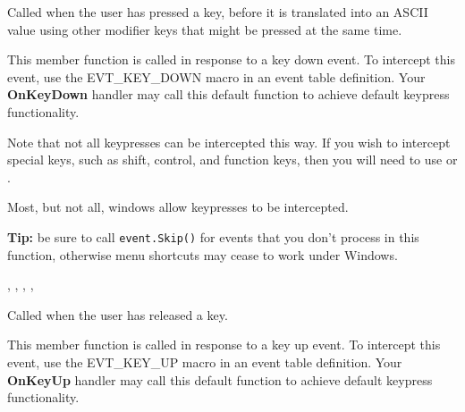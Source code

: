 
Called when the user has pressed a key, before it is translated into an ASCII value using other
modifier keys that might be pressed at the same time.




This member function is called in response to a key down event. To intercept this event,
use the EVT\_KEY\_DOWN macro in an event table definition. Your {\bf OnKeyDown} handler may call this
default function to achieve default keypress functionality.

Note that not all keypresses can be intercepted this way. If you wish to intercept special
keys, such as shift, control, and function keys, then you will need to use  or
.

Most, but not all, windows allow keypresses to be intercepted.

{\bf Tip:} be sure to call {\tt event.Skip()} for events that you don't process in this function,
otherwise menu shortcuts may cease to work under Windows.


, ,\rtfsp
{}, ,\rtfsp
{}

\label{wxwindowonkeyup}


Called when the user has released a key.




This member function is called in response to a key up event. To intercept this event,
use the EVT\_KEY\_UP macro in an event table definition. Your {\bf OnKeyUp} handler may call this
default function to achieve default keypress functionality.

